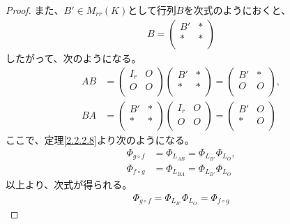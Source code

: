 \documentclass[dvipdfmx]{jsarticle}
\begin{document}
\begin{proof}
また、$B' \in M_{rr}(K)$として行列$B$を次式のようにおくと、
\begin{align*}
B = \begin{pmatrix}
B' & * \\
* & * \\
\end{pmatrix}
\end{align*}
したがって、次のようになる。
\begin{align*}
AB &= \begin{pmatrix}
I_{r} & O \\
O & O \\
\end{pmatrix}\begin{pmatrix}
B' & * \\
* & * \\
\end{pmatrix} = \begin{pmatrix}
B' & * \\
O & O \\
\end{pmatrix}, \\
BA &= \begin{pmatrix}
B' & * \\
* & * \\
\end{pmatrix}\begin{pmatrix}
I_{r} & O \\
O & O \\
\end{pmatrix} = \begin{pmatrix}
B' & O \\
* & O \\
\end{pmatrix}
\end{align*}
ここで、定理\ref{2.2.2.8}より次のようになる。
\begin{align*}
\varPhi_{g \circ f} &= \varPhi_{L_{AB}} = \varPhi_{L_{B'}}\varPhi_{L_{O}}, \\
\varPhi_{f \circ g} &= \varPhi_{L_{BA}} = \varPhi_{L_{B'}}\varPhi_{L_{O}}
\end{align*}
以上より、次式が得られる。
\begin{align*}
\varPhi_{g \circ f} = \varPhi_{L_{B'}}\varPhi_{L_{O}} = \varPhi_{f \circ g}
\end{align*}
\end{proof}
\end{document}
